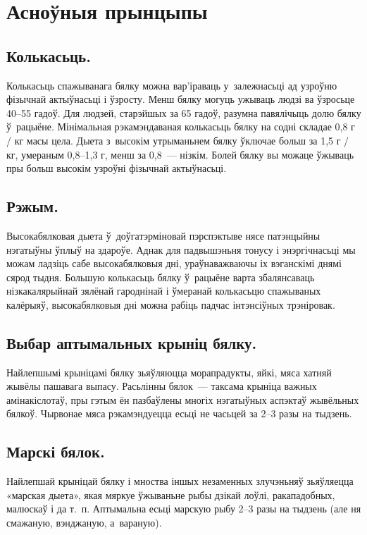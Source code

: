 \section{Асноўныя прынцыпы}

\subsection{Колькасьць.}
Колькасьць спажыванага бялку можна вар'іраваць у~залежнасьці ад узроўню фізычнай актыўнасьці і ўзросту. Менш бялку могуць ужываць людзі ва ўзросьце 40--55 гадоў. Для людзей, старэйшых за 65 гадоў, разумна павялічыць долю бялку ў~рацыёне. Мінімальная рэкамэндаваная колькасьць бялку на содні складае 0,8 г / кг масы цела. Дыета з~высокім утрыманьнем бялку ўключае больш за 1,5 г / кг, умераным 0,8--1,3 г, менш за 0,8~--- нізкім. Болей бялку вы можаце ўжываць пры больш высокім узроўні фізычнай актыўнасьці.

\subsection{Рэжым.}
Высокабялковая дыета ў~доўгатэрміновай пэрспэктыве нясе патэнцыйны нэгатыўны ўплыў на здароўе. Аднак для падвышэньня тонусу і энэргічнасьці мы можам ладзіць сабе высокабялковыя дні, ураўнаважваючы іх вэганскімі днямі сярод тыдня. Большую колькасьць бялку ў~рацыёне варта збалянсаваць нізкакалярыйнай зялёнай гароднінай і ўмеранай колькасьцю спажываных калёрыяў, высокабялковыя дні можна рабіць падчас інтэнсіўных трэніровак.

\subsection{Выбар аптымальных крыніц бялку.}
Найлепшымі крыніцамі бялку зьяўляюцца морапрадукты, яйкі, мяса хатняй жывёлы пашавага выпасу. Расьлінны бялок~--- таксама крыніца важных амінакіслотаў, пры гэтым ён пазбаўлены многіх нэгатыўных аспэктаў жывёльных бялкоў. Чырвонае мяса рэкамэндуецца есьці не часьцей за 2--3 разы на тыдзень.

\subsection{Марскі бялок.}
Найлепшай крыніцай бялку і мноства іншых незаменных злучэньняў зьяўляецца «марская дыета», якая мяркуе ўжываньне рыбы дзікай лоўлі, ракападобных, малюскаў і да т.~п. Аптымальна есьці марскую рыбу 2--3 разы на тыдзень (але ня смажаную, вэнджаную, а~вараную).

